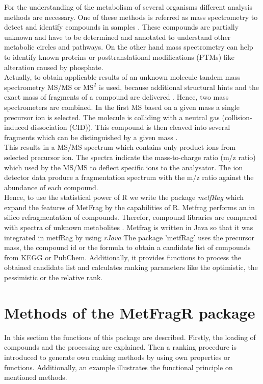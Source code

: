 \documentclass[12pt, a4paper]{scrartcl}\usepackage[]{graphicx}\usepackage[]{color}
\newcommand{\Rpackage}[1]{{\textit{#1}}}
\begin{document}
For the understanding of the metabolism of several organisms different analysis methods
are necessary. One of these methods is referred as mass spectrometry to detect and identify compounds 
in samples \cite{Dunn2008}. These compounds are partially unknown and have to be determined and annotated
to understand other metabolic circles and pathways. On the other hand mass spectrometry can help to 
identify known proteins or posttranslational modifications (PTMs) like alteration caused by phosphate. \\[0.5em]
Actually, to obtain applicable results of an unknown molecule tandem mass spectrometry MS/MS or \(\text{MS}^\text{2}\) 
is used, because additional structural hints and the exact mass of fragments of a compound are delivered \cite{Wolf2010}.
Hence, two mass spectrometers are combined. In the first MS based on a given mass a single precursor ion is selected. 
The molecule is colliding with a neutral gas (collision-induced dissociation (CID)). This compound is then cleaved into
several fragments which can be distinguished by a given mass \cite{Jeol2006}. \\[0.5em]
This results in a MS/MS spectrum which contains only product ions from selected precursor ion. 
The spectra indicate the mass-to-charge ratio (m/z ratio) which used by the MS/MS to deflect specific ions to the analysator. 
The ion detector data produce a fragmentation spectrum with the m/z ratio against the abundance of each compound. \\[0.5em]
Hence, to use the statistical power of R we write the package \Rpackage{metfRag} which expand the features of 
MetFrag by the capabilities of R. Metfrag performs an in silico refragmentation of compounds. 
Therefor, compound libraries are compared with spectra of unknown metabolites \cite{Wolf2010}.
Metfrag is written in Java so that it was integrated in metfRag by using \Rpackage{rJava} \cite{Urbanek2013}
The package 'metfRag' uses the precursor mass, the compound id or the formula to obtain a candidate list of compounds 
from KEGG or PubChem. Additionally, it provides functions to process the obtained candidate list and calculates ranking parameters
like the optimistic, the pessimistic or the relative rank.

\newpage
\section{Methods of the MetFragR package}
In this section the functions of this package are described. Firstly, the loading of compounds
and the processing are explained. Then a ranking procedure is introduced to generate own ranking methods by
using own properties or functions. Additionally, an example illustrates the functional principle
on mentioned methods. 
\end{document}
